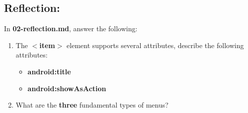 \documentclass{article}
\begin{document}
\subsection*{Reflection:} 
In \textbf{02-reflection.md}, answer the following:
\begin{enumerate}
	\item The \textbf{$<$item$>$} element supports several attributes, describe the following attributes:
			\begin{itemize}
				\item \textbf{android:title}
				\item \textbf{android:showAsAction}
			\end{itemize}
	\item What are the \textbf{three} fundamental types of menus?
\end{enumerate}
\end{document}
